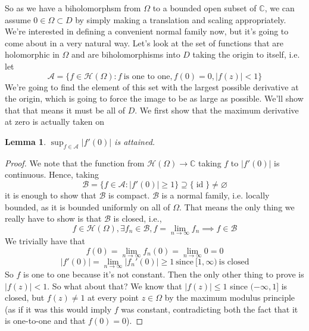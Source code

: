 \documentclass{article}
\newtheorem{lemma}{Lemma}
\newcommand{\mbb}[1]{\mathbb{#1}}
\newcommand{\mc}[1]{\mathcal{#1}}
\DeclareMathOperator{\Id}{id}
\begin{document}
So as we have a biholomorphsm from \(\Omega\) to a bounded open subset of \(\mbb{C}\), we can assume \(0 \in \Omega \subset D\) by simply making a translation and scaling appropriately. We're interested in defining a convenient normal family now, but it's going to come about in a very natural way. Let's look at the set of functions that are holomorphic in \(\Omega\) and are biholomorphisms into \(D\) taking the origin to itself, i.e. let
\begin{equation}\mc{A} = \{f \in \mc{H}(\Omega) : f \ \text{is one to one}, f(0) = 0, |f(z)| < 1\}\end{equation}
We're going to find the element of this set with the largest possible derivative at the origin, which is going to force the image to be as large as possible. We'll show that that means it must be all of \(D\).
We first show that the maximum derivative at zero is actually taken on
\begin{lemma}
\(\sup_{f \in \mc{A}}|f'(0)|\) is attained.
\end{lemma}
\begin{proof}
We note that the function from \(\mc{H}(\Omega) \to \mbb{C}\) taking \(f\) to \(|f'(0)|\) is continuous. Hence, taking
\begin{equation}\mc{B} = \{f \in \mc{A} : |f'(0) | \geq 1\} \supseteq \{\Id\} \neq \varnothing\end{equation}
it is enough to show that \(\mc{B}\) is compact. \(\mc{B}\) is a normal family, i.e. locally bounded, as it is bounded uniformly on all of \(\Omega\). That means the only thing we really have to show is that \(\mc{B}\) is closed, i.e.,
\begin{equation}f \in \mc{H}(\Omega), \exists f_n \in \mc{B}, f = \lim_{n \to \infty}f_n \implies f \in \mc{B}\end{equation}
We trivially have that
\begin{equation}f(0) = \lim_{n \to \infty}f_n(0) = \lim_{n \to \infty}0 = 0\end{equation}
\begin{equation}|f'(0)| = \lim_{n \to \infty}|f_n'(0)| \geq 1 \ \text{since} \ [1, \infty) \ \text{is closed}\end{equation}
So \(f\) is one to one because it's not constant. Then the only other thing to prove is \(|f(z)| < 1\). So what about that? We know that \(|f(z)| \leq 1\) since \((-\infty, 1]\) is closed, but \(f(z) \neq 1\) at every point \(z \in \Omega\) by the maximum modulus principle (as if it was this would imply \(f\) was constant, contradicting both the fact that it is one-to-one and that \(f(0) = 0\)).
\end{proof}
\end{document}
